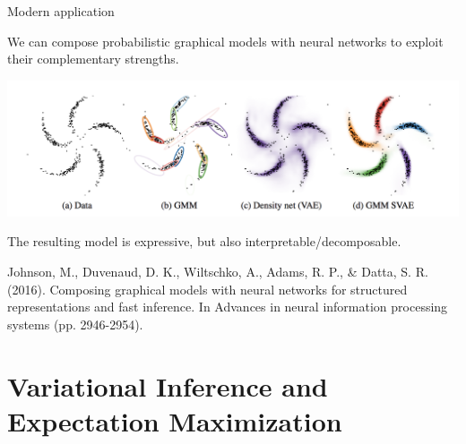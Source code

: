 \documentclass[10pt]{beamer}
\begin{document}
\begin{frame}{Modern application}

  \begin{minipage}[t][.9\textheight]{\textwidth}

We can compose probabilistic graphical models with neural networks to exploit their complementary strengths.  

\vspace{.2in}

\centering
\includegraphics[width=.95\textwidth]{images/composing_pgms_with_nns}

\vspace{.2in}

The resulting model is expressive, but also interpretable/decomposable.\\

    \vfill

\tiny Johnson, M., Duvenaud, D. K., Wiltschko, A., Adams, R. P., \& Datta, S. R. (2016). Composing graphical models with neural networks for structured representations and fast inference. In Advances in neural information processing systems (pp. 2946-2954).

  \end{minipage}
  
\end{frame}




\section{Variational Inference and Expectation Maximization}
\end{document}

